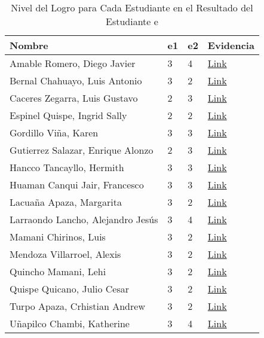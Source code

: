 \begin{landscape}
\begin{table}[h]
\centering
\begin{tabular}{L{6cm}|C{1cm}|C{1cm}|C{2cm}}
\hline
\textbf{Nombre} & 
\textbf{e1} & 
\textbf{e2} & 
\textbf{Evidencia} 
\\ \hline
Amable Romero, Diego Javier &
3 &
4 &
\href{https://drive.google.com/open?id=1RGE-0KmemYyM1_d2kqPFSByuEEYTf70C}{Link}
\\ \hline
Bernal Chahuayo, Luis Antonio &
3 &
2 &
\href{https://drive.google.com/open?id=1FeRY8FPwENPs6JGo3LrUYZigr4FfQQH4}{Link}
\\ \hline
Caceres Zegarra, Luis Gustavo &
2 &
3 &
\href{https://drive.google.com/open?id=1aRhn2lBo3sZXlTMA4sh9wJ5r5g2bXE8T}{Link}
\\ \hline
Espinel Quispe, Ingrid Sally &
2 &
2 &
\href{https://drive.google.com/open?id=135na5wEvQ_LrngLGUhVwp92BpkZ2PblH}{Link}
\\ \hline
Gordillo Viña, Karen &
3 &
3 &
\href{https://drive.google.com/open?id=12-LqWuAXj5IB53-Me7gi4mJz6In7qewI}{Link}
\\ \hline
Gutierrez Salazar, Enrique Alonzo &
2 &
3 &
\href{https://drive.google.com/open?id=10fti0Nvn_GhppfJQ0cGxxPrEwGgbgulw}{Link}
\\ \hline
Hancco Tancayllo, Hermith &
3 &
3 &
\href{https://drive.google.com/open?id=15XyNJkvHo4XuC1ylerS8IQey5eImNxRR}{Link}
\\ \hline
Huaman Canqui Jair, Francesco &
3 &
3 &
\href{https://drive.google.com/open?id=1KHvPDBSUBZqywpxbN_niUf8PdkRjzBoC}{Link}
\\ \hline
Lacuaña Apaza, Margarita &
3 &
2 &
\href{https://drive.google.com/open?id=1OZAFwkOkPnFwLvVwAAH-jvAhziwBx09o}{Link}
\\ \hline
Larraondo Lancho, Alejandro Jesús &
3 &
4 &
\href{https://drive.google.com/open?id=1qjRtWRIrA7fcinCeWOX74rG9vonaawIF}{Link}
\\ \hline
Mamani Chirinos, Luis &
3 &
2 &
\href{https://drive.google.com/open?id=1JrGsIkJzS_lwTkOaSZdIipVaRmakLodP}{Link}
\\ \hline
Mendoza Villarroel, Alexis &
3 &
2 &
\href{https://drive.google.com/open?id=1xQ0p9bxbJRba3aqW5BiKMy3jFEyogEPM}{Link}
\\ \hline
Quincho Mamani, Lehi &
3 &
2 &
\href{https://drive.google.com/open?id=1X4sgTvGoHOD-xrGULO0eLx6MiX9UB26f}{Link}
\\ \hline
Quispe Quicano, Julio Cesar &
3 &
2 &
\href{https://drive.google.com/open?id=1498VuZAYY9B6AScuvHA5EMFrCAxscPer}{Link}
\\ \hline
Turpo Apaza, Crhistian Andrew &
3 &
2 &
\href{https://drive.google.com/open?id=14HnFWBEkh2y6LEVVtxKpaJqsddbscORE}{Link}
\\ \hline
Uñapilco Chambi, Katherine &
3 &
4 &
\href{https://drive.google.com/open?id=1fXM-Ufvhy0M0FVDEkZ8dclLG2OK0P8ga}{Link}
\\ \hline
\end{tabular}
\caption{Nivel del Logro para Cada Estudiante en el Resultado del Estudiante \lbrack e\rbrack}
\label{tab:nivel_estudiante_e} 
\end{table}


\end{landscape}
